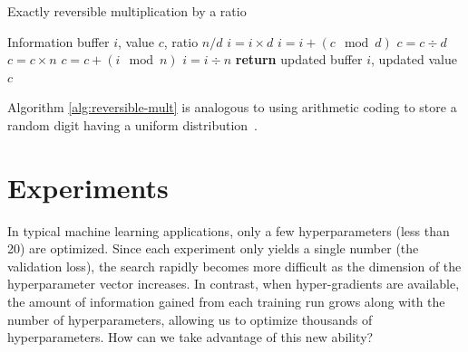 \documentclass{article}
\newcommand{\decay}{\gamma}
\begin{document}
%
\begin{algorithm}
   \caption{Exactly reversible multiplication by a ratio}
   \label{alg:reversible-mult}
\begin{algorithmic}[1]
    Information buffer $i$, value $c$, ratio $n / d$
   \State $i = i \times d$                \label{step:f1}
   \State $i = i + (c \! \mod d)$    \label{step:f2}
   \State $c = c \div d$                    \label{step:f3}
   \State $c = c \times n$                  \label{step:b1}
   \State $c = c +  (i \! \mod n)$          \label{step:b2}
   \State $i = i \div n$               \label{step:b3}
   \State \textbf{return} updated buffer $i$, updated value $c$
\end{algorithmic}
\end{algorithm}
%

%
%
Algorithm \ref{alg:reversible-mult} is analogous to using arithmetic coding to store a random digit having a uniform distribution~\citep{steinruecken2014a}.

\section{Experiments}

In typical machine learning applications, only a few hyperparameters (less than 20) are optimized.
Since each experiment only yields a single number (the validation loss), the search rapidly becomes more difficult as the dimension of the hyperparameter vector increases.
In contrast, when hyper-gradients are available, the amount of information gained from each training run grows along with the number of hyperparameters, allowing us to optimize thousands of hyperparameters. %
How can we take advantage of this new ability?
\end{document}

